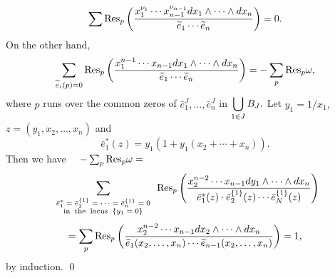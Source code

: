 {{\[ \sum {\rm Res}_p 
\left( \frac{ x_1^{\nu_1}\cdots x_{n-1}^{\nu_{n-1}}
dx_1 \wedge \cdots \wedge dx_n }
{{\widetilde e}_1 \cdots {\widetilde e}_n} \right)=0. \] 
On the other hand, 
\[ \sum_{{\widetilde e}_i(p)=0} {\rm Res}_p 
\left( \frac{ x_1^{n-1}\cdots x_{n-1}
dx_1 \wedge \cdots \wedge dx_n}{{\widetilde e}_1\cdots {\widetilde e}_n} \right) = 
-\sum_p{\rm Res}_p \omega , 
\] 
where $p$ runs over the common zeros of 
$\bar{e}^J_1, \ldots ,\bar{e}^J_n$ in 
$\displaystyle\bigcup_{1\in J}B_J.$ 
Let $y_1 = 1/x_1,$ $z=(y_1,x_2,\ldots ,x_n)$ and 
\[ \bar{e}^{*}_1(z) = 
y_1(1+ y_1(x_2+ \cdots + x_n)). \] 
Then we have \ \ 
$ -\sum_p{\rm Res}_p \omega = $
\[ \sum_{\scriptsize{\begin{array}{cc}\bar{e}^{\ast}_1 = 
\bar{e}_2^{\{ 1\} } 
= \cdots =\bar{e}_n^{\{ 1\} } = 0 \\ {\rm in} 
\; \; {\rm the }\; \; {\rm locus} \; \; 
\{ y_1 =0 \}\end{array}} } 
{\rm Res}_p \left(\frac{ x_2^{n-2}\cdots x_{n-1}
dy_1 \wedge \cdots \wedge dx_n }
{\bar{e}^{\ast}_1(z)\cdot
 \bar{e}^{\{ 1\} }_2(z)\cdots 
 \bar{e}^{\{ 1\} }_N(z)}
\right) \] 
\[ = \sum_p{\rm Res}_p
\left( \frac{ x_2^{n-2}\cdots x_{n-1}
dx_2 \wedge \cdots \wedge dx_n }
{{\widetilde e}_1(x_2,\ldots ,x_n) \cdots 
{\widetilde e}_{n-1}(x_2,\ldots ,x_n)} 
\right) = 1, \] 
by induction. \qed \bigskip 

}}
